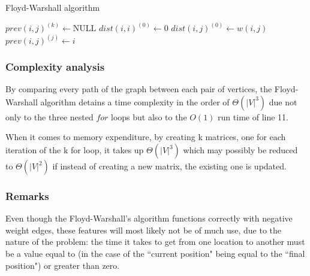 \begin{algorithm}[ht]
    \caption{Floyd-Warshall algorithm}
    \label{alg:floyd-warshall}
    \begin{algorithmic}[1]
             
                 {$prev(i,j)^{(k)} \gets \text{NULL}$}
                \EndFor
            \EndFor
             $dist(i,i)^{(0)} \gets 0$
            \EndFor
             
                \State $dist(i,j)^{(0)} \gets w(i,j)$
                \State $prev(i,j)^{(j)} \gets i$
            \EndFor
             
                    \EndIf
                \EndFor
            \EndFor
            \State {}
        \EndFunction
    \end{algorithmic}
\end{algorithm}

\subsubsection{Complexity analysis}
By comparing every path of the graph between each pair of vertices, the Floyd-Warshall algorithm detains a time complexity in the order of $\Theta(|V|^3)$ due not only to the three nested $for$ loops but also to the $O(1)$ run time of line 11.\par
When it comes to memory expenditure, by creating k matrices, one for each iteration of the k for loop, it takes up $\Theta(|V|^3)$ which may possibly be reduced to $\Theta(|V|^2)$ if instead of creating a new matrix, the existing one is updated.

\subsubsection{Remarks}
Even though the Floyd-Warshall's algorithm functions correctly with negative weight edges, these features will most likely not be of much use, due to the nature of the problem:
the time it takes to get from one location to another must be a value equal to (in the case of the ``current position" being equal to the ``final position") or greater than zero.